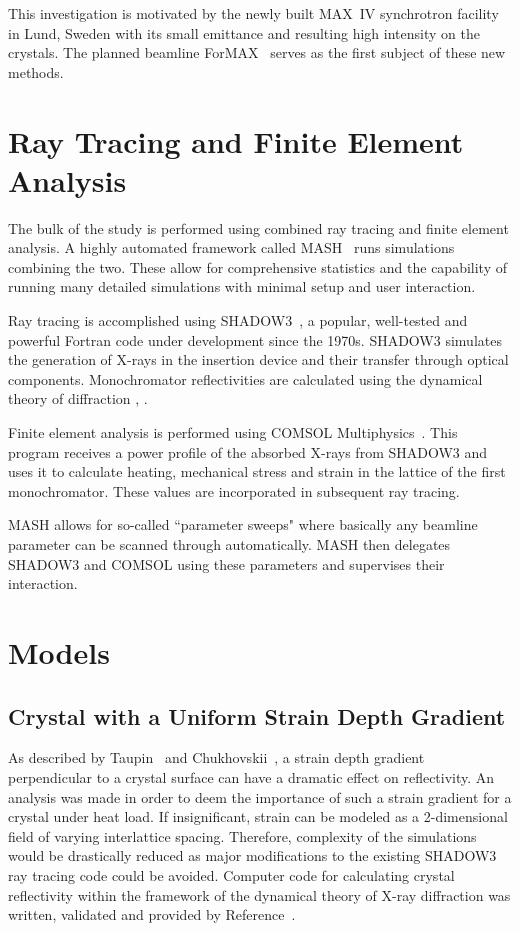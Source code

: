 \documentclass{iucr}
\begin{document}
This investigation is motivated by the newly built MAX~IV synchrotron facility in Lund, Sweden with its small emittance and resulting high intensity on the crystals. The planned beamline ForMAX~\cite{formax} serves as the first subject of these new methods.

\section{Ray Tracing and Finite Element Analysis}

The bulk of the study is performed using combined ray tracing and finite element analysis. A highly automated framework called MASH~\cite{mash} runs simulations combining the two. These allow for comprehensive statistics and the capability of running many detailed simulations with minimal setup and user interaction.

Ray tracing is accomplished using SHADOW3~\cite{shadow3}, a popular, well-tested and powerful Fortran code under development since the 1970s. SHADOW3 simulates the generation of X-rays in the insertion device and their transfer through optical components. Monochromator reflectivities are calculated using the dynamical theory of diffraction \cite{dynamicaltheory}, \cite{asymmetricdiffraction}.

Finite element analysis is performed using COMSOL Multiphysics~\cite{comsol}. This program receives a power profile of the absorbed X-rays from SHADOW3 and uses it to calculate heating, mechanical stress and strain in the lattice of the first monochromator. These values are incorporated in subsequent ray tracing.

MASH allows for so-called ``parameter sweeps" where basically any beamline parameter can be scanned through automatically. MASH then delegates SHADOW3 and COMSOL using these parameters and supervises their interaction.

\section{Models}

\subsection{Crystal with a Uniform Strain Depth Gradient}\label{strain_gradient} 
As described by Taupin~\cite{Taupin} and Chukhovskii~\cite{Chukhovskii}, a strain depth gradient perpendicular to a crystal surface can have a dramatic effect on reflectivity. An analysis was made in order to deem the importance of such a strain gradient for a crystal under heat load. If insignificant, strain can be modeled as a 2-dimensional field of varying interlattice spacing. Therefore, complexity of the simulations would be drastically reduced as major modifications to the existing SHADOW3 ray tracing code could be avoided. Computer code for calculating crystal reflectivity within the framework of the dynamical theory of X-ray diffraction was written, validated and provided by Reference~\cite{coins}.
\end{document}
